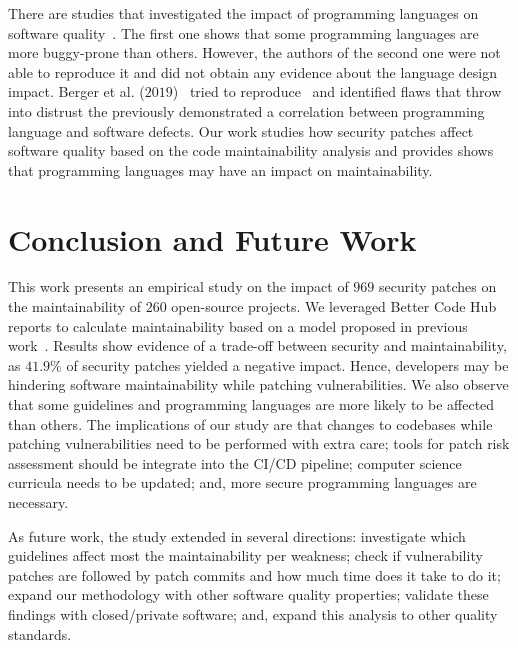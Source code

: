 \documentclass[smallextended]{svjour3}       %
\begin{document}
There are studies that investigated the impact of programming languages on software
quality~\cite{Ray:2014:LSS:2635868.2635922,Ray:2017:LSP:3144574.3126905}. The first
one shows that some programming languages are more buggy-prone than others. However,
the authors of the second one were not able to reproduce it and did not obtain any
evidence about the language design impact. 
Berger et al. ($2019$)~\cite{2019arXiv190110220B} tried to reproduce~\cite{Ray:2014:LSS:2635868.2635922,Ray:2017:LSP:3144574.3126905} 
and identified flaws that throw into distrust the 
previously demonstrated a correlation between programming language and software 
defects. Our work studies how security patches affect software quality based 
on the code maintainability analysis and provides shows that programming languages 
may have an impact on maintainability.

\section{Conclusion and Future Work}\label{sec:conclusions}

This work presents an empirical study on the impact of $969$ security
patches on the maintainability of $260$ open-source projects. We leveraged
Better Code Hub reports to calculate maintainability based on a model proposed in 
previous work~\cite{Olivari:2018,8919169}. Results show evidence of a 
trade-off between security and maintainability, as $41.9\%$ of security patches 
yielded a negative impact. Hence,
developers may be hindering software maintainability while patching 
vulnerabilities. We also observe that some guidelines 
and programming languages are more likely to be affected than others. The implications 
of our study are that changes to codebases while patching 
vulnerabilities need to be performed with extra care; tools
for patch risk assessment should be integrate into the CI/CD pipeline; computer science
curricula needs to be updated; and, more secure programming languages are necessary.

As future work, the study extended in several directions: 
investigate which guidelines affect most the maintainability per
weakness; check if vulnerability patches are followed by patch
commits and how much time does it take to do it; 
expand our methodology with other software quality properties; 
validate these findings with closed/private
software; and, expand this analysis to other quality standards.
 

\end{document}
